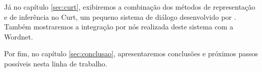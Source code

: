 
Já no capítulo \ref{sec:curt}, exibiremos a combinação dos métodos de representação e de inferência no Curt, um pequeno sistema de diálogo desenvolvido por \citet{BlackburnBos:2005}. Também mostraremos a integração por nós realizada deste sistema com a Wordnet.

Por fim, no capítulo \ref{sec:conclusao}, apresentaremos conclusões e próximos passos possíveis nesta linha de trabalho.



%
%
%

